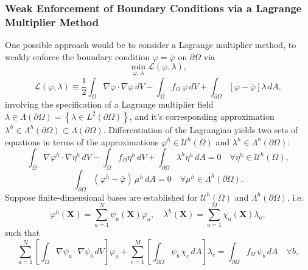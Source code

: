 	\subsubsection*{Weak Enforcement of Boundary Conditions via a Lagrange Multiplier Method}
	
	One possible approach would be to consider a Lagrange multiplier method, to weakly enforce the boundary condition $\varphi = \bar{\varphi}$ on $\partial \Omega$ via
	\begin{equation}
		\min_{\varphi, \, \lambda} \mathcal{L}(\varphi,\lambda),
	\end{equation}
	\begin{equation}
	\mathcal{L}(\varphi,\lambda) \equiv \frac{1}{2} \int_{\Omega} \nabla \varphi \cdot \nabla \varphi \, dV - \int_{\Omega} f_{\Omega} \, \varphi \, dV + \int_{\partial \Omega} \left[ \varphi - \bar{\varphi} \right] \lambda \, dA,
\end{equation}
	involving the specification of a Lagrange multiplier field $\lambda \in \Lambda (\partial \Omega) = \left\{ \lambda \in L^2 (\partial \Omega) \right\}$, and it's corresponding approximation $\lambda^h \in \Lambda^h (\partial \Omega) \subset \Lambda (\partial \Omega)$. Differentiation of the Lagrangian yields two sets of equations in terms of the approximations $\varphi^h \in \mathcal{U}^h (\Omega)$ and $\lambda^h \in \Lambda^h (\partial \Omega)$:
	\begin{equation}
		\int_{\Omega} \nabla \varphi^h \cdot \nabla \eta^h \, dV - \int_\Omega f_\Omega \eta^h \, dV + \int_{\partial \Omega} \lambda^h \eta^h \, dA = 0 \quad \forall \eta^h \in \mathcal{U}^h (\Omega),
	\end{equation}
	\begin{equation}
		\int_{\partial \Omega} (\varphi^h - \bar{\varphi}) \, \mu^h \, dA = 0 \quad \forall \mu^h \in \Lambda^h (\partial \Omega).
	\end{equation}
	Suppose finite-dimensional bases are established for $\mathcal{U}^h (\Omega)$ and $\Lambda^h (\partial \Omega)$, i.e.
\begin{equation}
	\varphi^h (\mathbf{X}) = \sum_{a=1}^{N} \psi_a (\mathbf{X}) \varphi_a, \quad \lambda^h (\mathbf{X}) = \sum_{a=1}^{M} \chi_a (\mathbf{X}) \lambda_a,
\end{equation}
such that
\begin{equation}
	\sum_{a=1}^N \left[ \int_{\Omega} \nabla \psi_a \cdot \nabla \psi_b \, dV \right] \varphi_a + \sum_{c=1}^M \left[ \int_{\partial \Omega} \psi_b \, \chi_c \, dA \right] \lambda_c = \int_{\partial \Omega} f_\Omega \, \psi_b \, dA \quad \forall b,
\end{equation}
